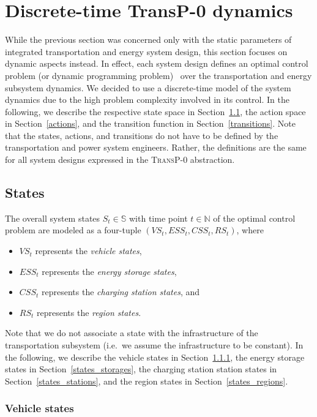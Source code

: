 \section{Discrete-time \textbf{TransP-0} dynamics}
\label{dynamics}

While the previous section was concerned only with the static parameters of integrated transportation and energy system design, this section focuses on dynamic aspects instead. In effect, each system design defines an optimal control problem (or dynamic programming problem)~\cite{Bertsekas1995} over the transportation and energy subsystem dynamics. We decided to use a discrete-time model of the system dynamics due to the high problem complexity involved in its control. In the following, we describe the respective state space in Section~\ref{states}, the action space in Section~\ref{actions}, and the transition function in Section~\ref{transitions}. Note that the states, actions, and transitions do not have to be defined by the transportation and power system engineers. Rather, the definitions are the same for all system designs expressed in the \textsc{TransP-0} abstraction.

\subsection{States}
\label{states}

The overall system states $S_t \in \mathbb{S}$ with time point $t \in \mathbb{N}$ of the optimal control problem are modeled as a four-tuple $(VS_t, ESS_t, CSS_t, RS_t)$, where
\begin{itemize}
	\item $VS_t$ represents the \textit{vehicle  states},
	\item $ESS_t$ represents the \textit{energy storage states},
	\item $CSS_t$ represents the \textit{charging station states}, and
	\item $RS_t$ represents the \textit{region states}.
\end{itemize}
Note that we do not associate a state with the infrastructure of the transportation subsystem (i.e.\ we assume the infrastructure to be constant). In the following, we describe the vehicle states in Section~\ref{states_vehicles}, the energy storage states in Section~\ref{states_storages}, the charging station station states in Section~\ref{states_stations}, and the region states in Section~\ref{states_regions}.

\subsubsection{Vehicle states}
\label{states_vehicles}

